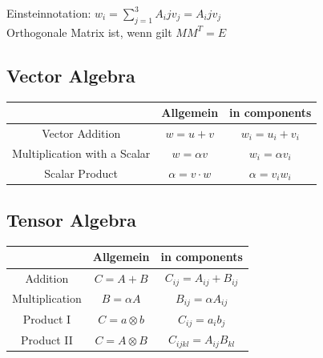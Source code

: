 \documentclass[a4paper]{scrartcl}
\begin{document}
Einsteinnotation: $w_i=\sum_{j=1}^{3}A_ijv_j=A_ijv_j$
\\
Orthogonale Matrix ist, wenn gilt $MM^T=E$
\\


\subsection{Vector Algebra}
\begin{tabular}{|c|c|c|}
\hline  & Allgemein & in components \\ 
\hline Vector Addition & $w=u+v$ & $w_i=u_i+v_i$ \\ 
\hline Multiplication with a Scalar & $w=\alpha v$ & $w_i=\alpha v_i$ \\ 
\hline Scalar Product & $\alpha = v \cdot w $ & $\alpha = v_i w_i$ \\ 
\hline 
\end{tabular} 

\subsection{Tensor Algebra}
\begin{tabular}{|c|c|c|}
\hline  & Allgemein & in components \\ 
\hline Addition & $C=A+B$ & $C_{ij}=A_{ij}+B_{ij}$ \\ 
\hline Multiplication& $B=\alpha A$ & $B_{ij}=\alpha A_{ij}$ \\ 
\hline Product I & $C = a \otimes b $ & $C_{ij} = a_i b_j$ \\ 
\hline Product II& $C = A \otimes B $ & $C_{ijkl} = A_{ij} B_{kl}$ \\
\hline 
\end{tabular} 
\end{document}
